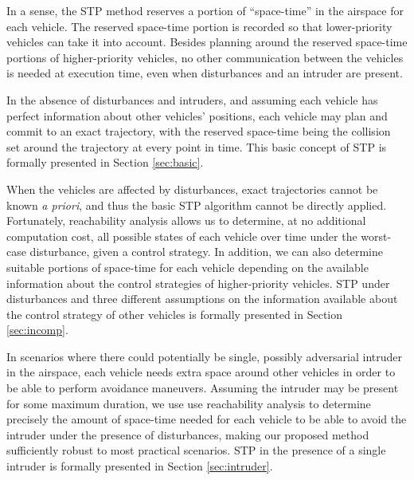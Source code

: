 In a sense, the STP method reserves a portion of ``space-time'' in the airspace for each vehicle. The reserved space-time portion is recorded so that lower-priority vehicles can take it into account. Besides planning around the reserved space-time portions of higher-priority vehicles, no other communication between the vehicles is needed at execution time, even when disturbances and an intruder are present.


In the absence of disturbances and intruders, and assuming each vehicle has perfect information about other vehicles' positions, each vehicle may plan and commit to an exact trajectory, with the reserved space-time being the collision set around the trajectory at every point in time. This basic concept of STP is formally presented in Section \ref{sec:basic}.

When the vehicles are affected by disturbances, exact trajectories cannot be known \textit{a priori}, and thus the basic STP algorithm cannot be directly applied. Fortunately, reachability analysis allows us to determine, at no additional computation cost, all possible states of each vehicle over time under the worst-case disturbance, given a control strategy. In addition, we can also determine suitable portions of space-time for each vehicle depending on the available information about the control strategies of higher-priority vehicles. STP under disturbances and three different assumptions on the information available about the control strategy of other vehicles is formally presented in Section \ref{sec:incomp}.

In scenarios where there could potentially be single, possibly adversarial intruder in the airspace, each vehicle needs extra space around other vehicles in order to be able to perform avoidance maneuvers. Assuming the intruder may be present for some maximum duration, we use use reachability analysis to determine precisely the amount of space-time needed for each vehicle to be able to avoid the intruder under the presence of disturbances, making our proposed method sufficiently robust to most practical scenarios. STP in the presence of a single intruder is formally presented in Section \ref{sec:intruder}.
